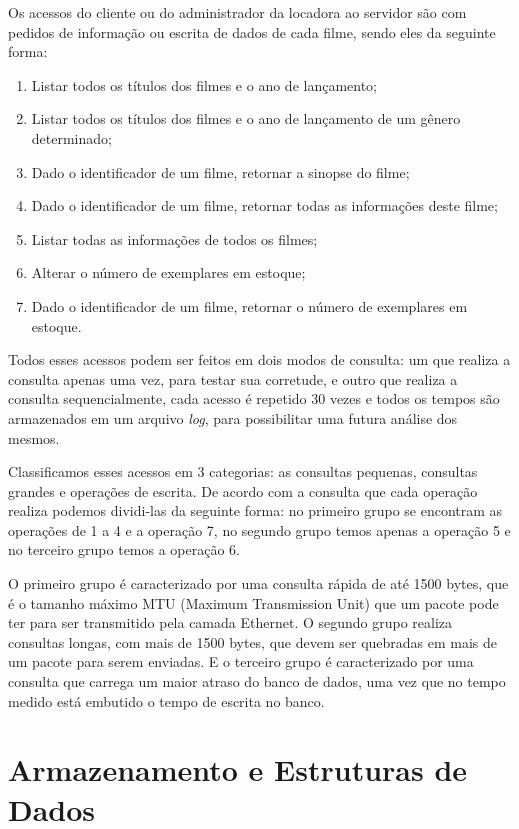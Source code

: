 \documentclass[12pt,a4paper]{article}
\newenvironment{myenumerate}{
\begin{enumerate}
 \setlength{\itemsep}{1pt}
 \setlength{\parskip}{0pt}
 \setlength{\parsep}{0pt}
}{\end{enumerate}}
\begin{document}
Os acessos do cliente ou do administrador da locadora ao servidor são com pedidos de informação ou escrita de dados de cada filme, sendo eles da seguinte forma:

\begin {myenumerate}
\item Listar todos os títulos dos filmes e o ano de lançamento;
\item Listar todos os títulos dos filmes e o ano de lançamento de um gênero determinado;
\item Dado o identificador de um filme, retornar a sinopse do filme;
\item Dado o identificador de um filme, retornar todas as informações deste filme;
\item Listar todas as informações de todos os filmes;
\item Alterar o número de exemplares em estoque;
\item Dado o identificador de um filme, retornar o número de exemplares
em estoque.
\end{myenumerate}

    Todos esses acessos podem ser feitos em dois modos de consulta: um que realiza a consulta apenas uma vez, para testar sua corretude, e outro que realiza a consulta sequencialmente, cada acesso é repetido 30 vezes e todos os tempos são armazenados em um arquivo {\it log}, para possibilitar uma futura análise dos mesmos.
    
    Classificamos esses acessos em 3 categorias: as consultas pequenas, consultas grandes e operações de escrita. De acordo com a consulta que cada operação realiza podemos dividi-las da seguinte forma: no primeiro grupo se encontram as operações de 1 a 4 e a operação 7, no segundo grupo temos apenas a operação 5 e no terceiro grupo temos a operação 6. 
    
O primeiro grupo é caracterizado por uma consulta rápida de até 1500 bytes, que é o tamanho máximo MTU (Maximum Transmission Unit) que um pacote pode ter para ser transmitido pela camada Ethernet. O segundo grupo realiza consultas longas, com mais de 1500 bytes, que devem ser quebradas em mais de um pacote para serem enviadas. E o terceiro grupo é caracterizado por uma consulta que carrega um maior atraso do banco de dados, uma vez que no tempo medido está embutido o tempo de escrita no banco.


\section{Armazenamento e Estruturas de Dados}
\end{document}
